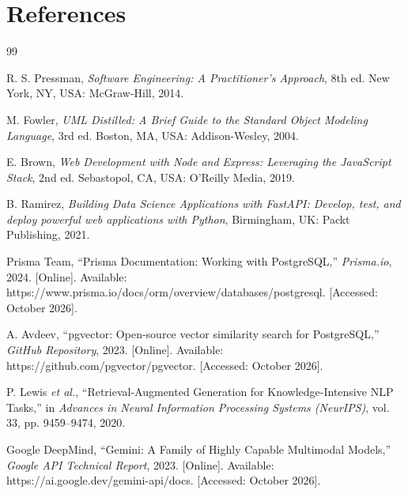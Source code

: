 \section{References}
\renewcommand{\refname}{} %
\begin{thebibliography}{99}

R. S. Pressman, \emph{Software Engineering: A Practitioner's Approach}, 8th ed. New York, NY, USA: McGraw-Hill, 2014.

M. Fowler, \emph{UML Distilled: A Brief Guide to the Standard Object Modeling Language}, 3rd ed. Boston, MA, USA: Addison-Wesley, 2004.

E. Brown, \emph{Web Development with Node and Express: Leveraging the JavaScript Stack}, 2nd ed. Sebastopol, CA, USA: O'Reilly Media, 2019.

B. Ramirez, \emph{Building Data Science Applications with FastAPI: Develop, test, and deploy powerful web applications with Python}, Birmingham, UK: Packt Publishing, 2021.

Prisma Team, ``Prisma Documentation: Working with PostgreSQL,'' \emph{Prisma.io}, 2024. [Online]. Available: https://www.prisma.io/docs/orm/overview/databases/postgresql. [Accessed: October 2026].

A. Avdeev, ``pgvector: Open-source vector similarity search for PostgreSQL,'' \emph{GitHub Repository}, 2023. [Online]. Available: https://github.com/pgvector/pgvector. [Accessed: October 2026].

P. Lewis \emph{et al.}, ``Retrieval-Augmented Generation for Knowledge-Intensive NLP Tasks,'' in \emph{Advances in Neural Information Processing Systems (NeurIPS)}, vol. 33, pp. 9459--9474, 2020.

Google DeepMind, ``Gemini: A Family of Highly Capable Multimodal Models,'' \emph{Google API Technical Report}, 2023. [Online]. Available: https://ai.google.dev/gemini-api/docs. [Accessed: October 2026].

\end{thebibliography}


